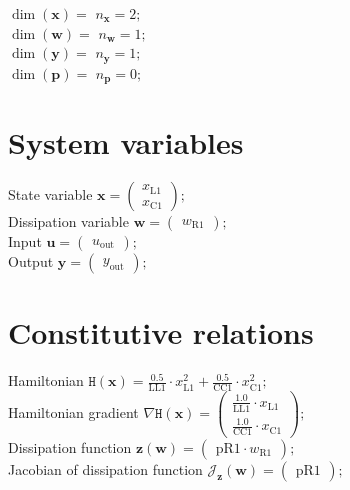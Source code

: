\documentclass[11pt, oneside]{article}      %
\begin{document}
%
$\dim(\mathbf{x})=$ $ n_\mathbf{x} = 2 ; $ 
%
\\
%
$\dim(\mathbf{w})=$ $ n_\mathbf{w} = 1 ; $ 
%
\\
%
$\dim(\mathbf{y})=$ $ n_\mathbf{y} = 1 ; $ 
%
\\
%
$\dim(\mathbf{p})=$ $ n_\mathbf{p} = 0 ; $ 
%
\\
%
%
\section{System variables}
%
State variable $ \mathbf{x} = \left(\begin{array}{c}x_{\mathrm{L1}}\\x_{\mathrm{C1}}\end{array}\right) ; $ 
%
\\
%
Dissipation variable $ \mathbf{w} = \left(\begin{array}{c}w_{\mathrm{R1}}\end{array}\right) ; $ 
%
\\
%
Input $ \mathbf{u} = \left(\begin{array}{c}u_{\mathrm{out}}\end{array}\right) ; $ 
%
\\
%
Output $ \mathbf{y} = \left(\begin{array}{c}y_{\mathrm{out}}\end{array}\right) ; $ 
%
\\
%
%
\section{Constitutive relations}
%
Hamiltonian $ \mathtt{H}(\mathbf{x}) = \frac{0.5}{\mathrm{LL1}} \cdot x_{\mathrm{L1}}^{2} + \frac{0.5}{\mathrm{CC1}} \cdot x_{\mathrm{C1}}^{2} ; $ 
%
\\
%
Hamiltonian gradient $ \nabla \mathtt{H}(\mathbf{x}) = \left(\begin{array}{c}\frac{1.0}{\mathrm{LL1}} \cdot x_{\mathrm{L1}}\\\frac{1.0}{\mathrm{CC1}} \cdot x_{\mathrm{C1}}\end{array}\right) ; $ 
%
\\
%
Dissipation function $ \mathbf{z}(\mathbf{w}) = \left(\begin{array}{c}\mathrm{pR1} \cdot w_{\mathrm{R1}}\end{array}\right) ; $ 
%
\\
%
Jacobian of dissipation function $ \mathcal{J}_{\mathbf{z}}(\mathbf{w}) = \left(\begin{array}{c}\mathrm{pR1}\end{array}\right) ; $ 
%
\\
%
%
\end{document}
